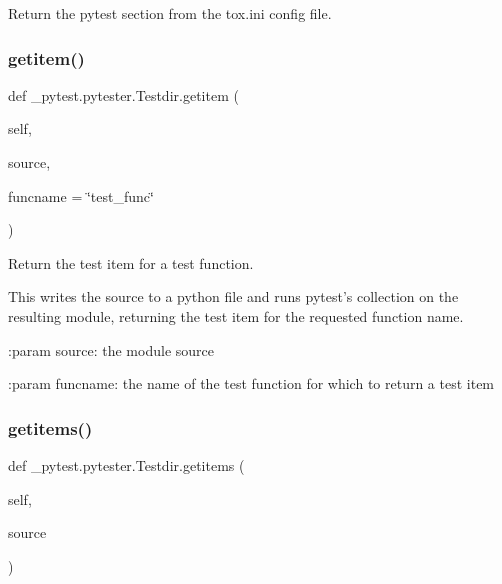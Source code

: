 \begin{DoxyVerb}Return the pytest section from the tox.ini config file.\end{DoxyVerb}
 \mbox{\label{class__pytest_1_1pytester_1_1_testdir_a5ab8fa8e29ef69d0c8f9232b00790097}} 
\subsubsection{\texorpdfstring{getitem()}{getitem()}}
{\footnotesize\ttfamily def \+\_\+pytest.\+pytester.\+Testdir.\+getitem (\begin{DoxyParamCaption}\item[{}]{self,  }\item[{}]{source,  }\item[{}]{funcname = {\ttfamily \char`\"{}test\+\_\+func\char`\"{}} }\end{DoxyParamCaption})}

\begin{DoxyVerb}Return the test item for a test function.

This writes the source to a python file and runs pytest's collection on
the resulting module, returning the test item for the requested
function name.

:param source: the module source

:param funcname: the name of the test function for which to return a
    test item\end{DoxyVerb}
 \mbox{\label{class__pytest_1_1pytester_1_1_testdir_a553d8582c95aea7218dc719023e43214}} 
\subsubsection{\texorpdfstring{getitems()}{getitems()}}
{\footnotesize\ttfamily def \+\_\+pytest.\+pytester.\+Testdir.\+getitems (\begin{DoxyParamCaption}\item[{}]{self,  }\item[{}]{source }\end{DoxyParamCaption})}

